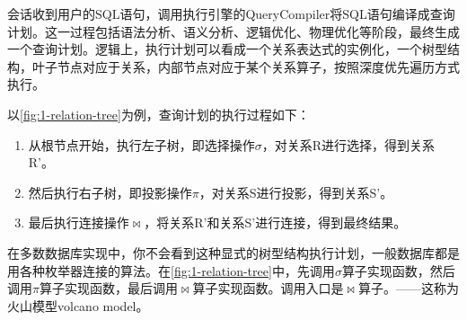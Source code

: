 会话收到用户的SQL语句，调用执行引擎的QueryCompiler将SQL语句编译成查询计划。这一过程包括语法分析、语义分析、逻辑优化、物理优化等阶段，最终生成一个查询计划。逻辑上，执行计划可以看成一个关系表达式的实例化，一个树型结构，叶子节点对应于关系，内部节点对应于某个关系算子，按照深度优先遍历方式执行。

以\figurename\ref{fig:1-relation-tree}为例，查询计划的执行过程如下：
\begin{enumerate}
    \item 从根节点开始，执行左子树，即选择操作$\sigma$，对关系R进行选择，得到关系R'。
    \item 然后执行右子树，即投影操作$\pi$，对关系S进行投影，得到关系S'。
    \item 最后执行连接操作$\bowtie$，将关系R'和关系S'进行连接，得到最终结果。
\end{enumerate}

在多数数据库实现中，你不会看到这种显式的树型结构执行计划，一般数据库都是用各种枚举器连接的算法。在\figurename\ref{fig:1-relation-tree}中，先调用$\sigma$算子实现函数，然后调用$\pi$算子实现函数，最后调用$\bowtie$算子实现函数。调用入口是$\bowtie$算子。——这称为火山模型volcano model。


